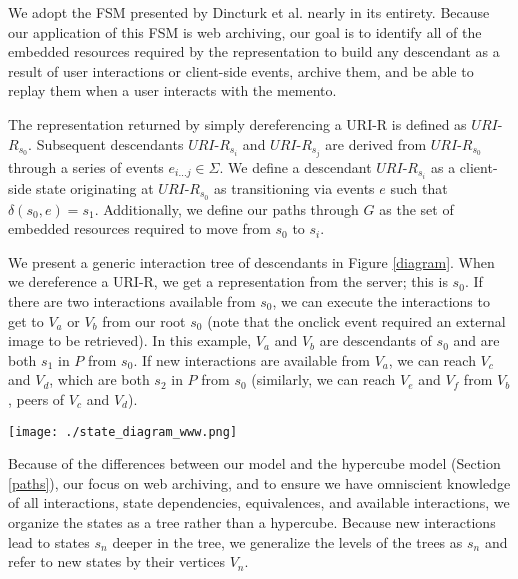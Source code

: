 \documentclass{sig-alternate}
\begin{document}
We adopt the FSM presented by Dincturk et al. nearly in its entirety. Because our application of this FSM is web archiving, our goal is to identify all of the embedded resources required by the representation to build any descendant as a result of user interactions or client-side events, archive them, and be able to replay them when a user interacts with the memento. 

The representation returned by simply dereferencing a URI-R is defined as $URI$-$R_{s_0}$. Subsequent descendants $URI$-$R_{s_i}$ and $URI$-$R_{s_j}$ are derived from $URI$-$R_{s_0}$ through a series of events $e_{i...j} \in \Sigma$. We define a descendant $URI$-$R_{s_i}$ as a client-side state originating at $URI$-$R_{s_0}$ as transitioning via events $e$ such that $\delta(s_0, e) = s_1$. Additionally, we define our paths through $G$ as the set of embedded resources required to move from $s_0$ to $s_i$.

We present a generic interaction tree of descendants in Figure \ref{diagram}. When we dereference a URI-R, we get a representation from the server; this is $s_0$. If there are two interactions available from $s_0$, we can execute the interactions to get to $V_a$ or $V_b$ from our root $s_0$ (note that the onclick event required an external image to be retrieved). In this example, $V_a$ and $V_b$ are descendants of $s_0$ and are both $s_1$ in $P$ from $s_0$. If new interactions are available from $V_a$, we can reach $V_c$ and $V_d$, which are both $s_2$ in $P$ from $s_0$ (similarly, we can reach $V_e$ and $V_f$ from $V_b$, peers of $V_c$ and $V_d$). 


\begin{figure*}[hT]
\centering
    \texttt{[image: ./state\_diagram\_www.png]}
  \caption{A generic, three-level client-side state tree with interactions as state transitions.}
\label{diagram}
\end{figure*}

Because of the differences between our model and the hypercube model (Section \ref{paths}), our focus on web archiving, and to ensure we have omniscient knowledge of all interactions, state dependencies, equivalences, and available interactions, we organize the states as a tree rather than a hypercube. Because new interactions lead to states $s_n$ deeper in the tree, we generalize the levels of the trees as $s_n$ and refer to new states by their vertices $V_n$.


\end{document}
